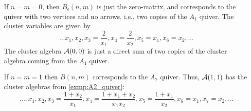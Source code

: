 \begin{example}
	If $n=m=0$, then $B_{\epsilon}(n,m)$ is just the zero-matrix, and corresponds to the
	quiver with two vertices and no arrows, i.e., two copies of the $A_1$ quiver. The
	cluster variables are given by
	\begin{equation*}
		\dots x_1, x_2, x_3 =\frac{2}{x_1}, x_4=\frac{2}{x_2}, x_5=x_1, x_6=x_2, \dots
	\end{equation*}
	The cluster algebra $\mathcal{A}(0,0)$ is just a direct sum of two copies of the cluster
	algebra coming from the $A_1$ quiver.

	If $n=m=1$ then $B(n,m)$ corresponds to the $A_2$ quiver. Thus, $\mathcal{A}(1,1)$ has the
	cluster algebras from \cref{exmp:A2_quiver}:
	\begin{equation*}
		\dots, x_1, x_2, x_3=\frac{1 + x_2}{x_1}, x_4=\frac{1 + x_1 + x_2}{x_1x_2}, x_5=\frac{1 + x_1}{x_2}, x_6=x_1, x_7=x_2, \dotsc
	\end{equation*}


\end{example}
